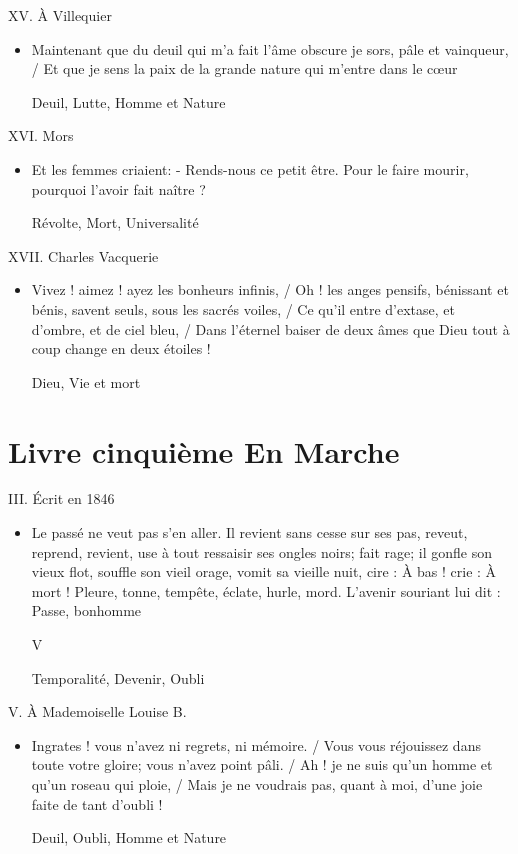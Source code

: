 \documentclass[french,a4paper,11pt,answers]{exam}
\newcommand{\cit}[2]{\og #1 \fg{} \begin{solution}{ #2 }\end{solution}} %
\begin{document}
	\begin{cadre}{XV. À Villequier}
		\begin{itemize}
			\item \cit{Maintenant que du deuil qui m'a fait l'âme obscure je sors, pâle et vainqueur, / Et que je sens la paix de la grande nature qui m'entre dans le c\oe{}ur}{Deuil, Lutte, Homme et Nature}
		\end{itemize}
	\end{cadre}
	
	\begin{cadre}{XVI. Mors}
		\begin{itemize}
			\item \cit{Et les femmes criaient: - Rends-nous ce petit être. Pour le faire mourir, pourquoi l'avoir fait naître ?}{Révolte, Mort, Universalité}
		\end{itemize}
	\end{cadre}
	
	\begin{cadre}{XVII. Charles Vacquerie}
		\begin{itemize}
			\item \cit{Vivez ! aimez ! ayez les bonheurs infinis, / Oh ! les anges pensifs, bénissant et bénis, savent seuls, sous les sacrés voiles, / Ce qu'il entre d'extase, et d'ombre, et de ciel bleu, / Dans l'éternel baiser de deux âmes que Dieu tout à coup change en deux étoiles !}{Dieu, Vie et mort}
		\end{itemize}
	\end{cadre}

	\section{Livre cinquième \og En Marche \fg}
	
	\begin{cadre}{III. Écrit en 1846}
		\begin{itemize}
			\item \cit{Le passé ne veut pas s'en aller. Il revient sans cesse sur ses pas, reveut, reprend, revient, use à tout ressaisir ses ongles noirs; fait rage; il gonfle son vieux flot, souffle son vieil orage, vomit sa vieille nuit, cire : À bas ! crie : À mort ! Pleure, tonne, tempête, éclate, hurle, mord. L'avenir souriant lui dit : Passe, bonhomme}V{Temporalité, Devenir, Oubli}
		\end{itemize}
	\end{cadre}
	
	\begin{cadre}{V. À Mademoiselle Louise B.}
		\begin{itemize}
			\item \cit{Ingrates ! vous n'avez ni regrets, ni mémoire. / Vous vous réjouissez dans toute votre gloire; vous n'avez point pâli. / Ah ! je ne suis qu'un homme et qu'un roseau qui ploie, / Mais je ne voudrais pas, quant à moi, d'une joie faite de tant d'oubli !}{Deuil, Oubli, Homme et Nature}
		\end{itemize}
	\end{cadre}
	
\end{document}
